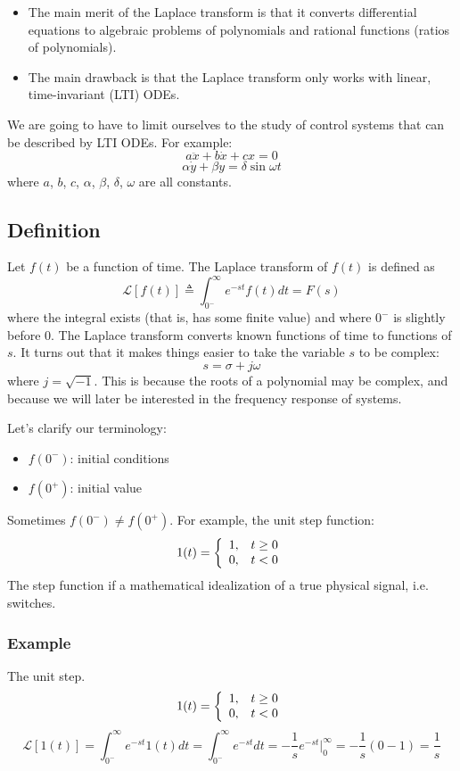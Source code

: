 \documentclass{book}
\newcommand{\LT}{\mathcal{L}}
\newcommand{\jw}{j\omega}
\newcommand{\exmp}{\subsubsection*{Example}}
\begin{document}
\begin{itemize}
	\item The main merit of the Laplace transform is that it converts differential equations to algebraic problems of polynomials and rational functions (ratios of polynomials).
	\item The main drawback is that the Laplace transform only works with linear, time-invariant (LTI) ODEs.
\end{itemize}
We are going to have to limit ourselves to the study of control systems that can be described by LTI ODEs. For example:
\[ a\ddot{x} + b\dot{x} + cx = 0 \]
\[ \alpha \dot{y} + \beta y = \delta \sin \omega t \]
where $ a $, $ b $, $ c $, $ \alpha $, $ \beta $, $ \delta $, $ \omega $ are all constants.

\subsection*{Definition}
Let $ f(t) $ be a function of time. The Laplace transform of $ f(t) $ is defined as
\[ \LT[f(t)] \triangleq \int_{0^-}^{\infty} e^{-st}f(t)dt = F(s) \]
where the integral exists (that is, has some finite value) and where $ 0^- $ is slightly before 0. The Laplace transform converts known functions of time to functions of $ s $. It turns out that it makes things easier to take the variable $ s $ to be complex: 
\[ s=\sigma+\jw \]
where $ j=\sqrt{-1} $. This is because the roots of a polynomial may be complex, and because we will later be interested in the frequency response of systems.

Let's clarify our terminology:
\begin{itemize}
	\item $ f(0^-) $: initial conditions
	\item $ f(0^+) $: initial value
\end{itemize}
Sometimes $ f(0^-) \neq f(0^+)  $. For example, the unit step function:
\[ 1(t) = \left\{\begin{array}{c c}
	1,&t\geq0\\0,&t<0
	\end{array}\right. \]
The step function if a mathematical idealization of a true physical signal, i.e. switches.

\exmp
The unit step.
\[ 1(t) = \left\{\begin{array}{c c}
1,&t\geq0\\0,&t<0
\end{array}\right. \]
\[ \LT [1(t)] = \int_{0^-}^{\infty} e^{-st}1(t)dt = \int_{0^-}^{\infty}e^{-st}dt = -\frac{1}{s}e^{-st}|_0^\infty = -\frac{1}{s}(0-1) = \frac{1}{s} \]
\end{document}
